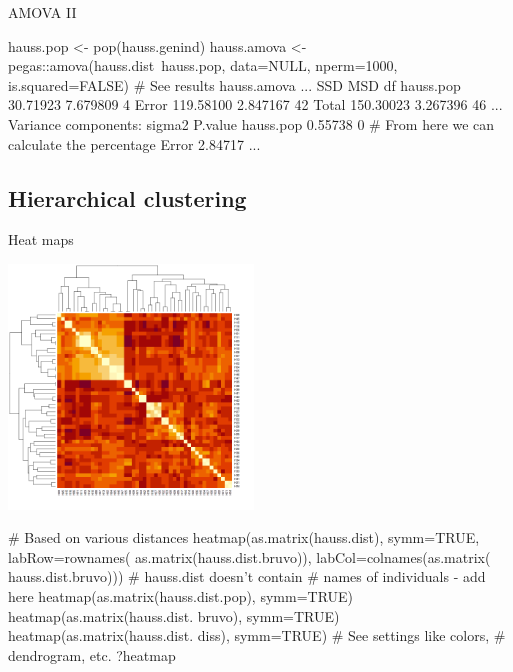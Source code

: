 \documentclass[compress, ucs, xelatex, 11pt, xcolor=svgnames, aspectratio=169,
	hyperref={
		bookmarks=true,
		unicode=true,
		colorlinks=true,
		pdftitle={Molecular data in R},
		plainpages=false,
		pdfauthor={Vojtech Zeisek},
		pdfsubject={Course about phylogeny and evolution in R},
		pdfcreator={XeLaTeX},
		pdfkeywords={R, evolution, phylogeny, molecular data},
		linkcolor=Crimson, %
		anchorcolor=Magenta, %
		citecolor=Magenta, %
		filecolor=Magenta, %
		menucolor=Magenta, %
		urlcolor=DodgerBlue, %
		pdftex},
	url={hyphens, lowtilde} %
	]{beamer}
\begin{document}
\begin{frame}[fragile]{AMOVA II}
	\begin{spluscode}
    hauss.pop <- pop(hauss.genind)
    hauss.amova <- pegas::amova(hauss.dist~hauss.pop, data=NULL,
      nperm=1000, is.squared=FALSE)
    # See results
    hauss.amova
    ...
                    SSD      MSD df
    hauss.pop  30.71923 7.679809  4
    Error     119.58100 2.847167 42
    Total     150.30023 3.267396 46
    ...
    Variance components:
               sigma2 P.value
    hauss.pop 0.55738       0 # From here we can calculate the percentage
    Error     2.84717
    ...
	\end{spluscode}
\end{frame}

\subsection{Hierarchical clustering}

\begin{frame}[fragile]{Heat maps}
	\label{hierclust}
	\begin{multicols}{2}
		\includegraphics[height=6.5cm]{heatmap.png}
		\columnbreak
		\begin{spluscode}
    # Based on various distances
    heatmap(as.matrix(hauss.dist),
      symm=TRUE, labRow=rownames(
      as.matrix(hauss.dist.bruvo)),
      labCol=colnames(as.matrix(
      hauss.dist.bruvo)))
      # hauss.dist doesn't contain
      # names of individuals - add here
    heatmap(as.matrix(hauss.dist.pop),
      symm=TRUE)
    heatmap(as.matrix(hauss.dist.
      bruvo), symm=TRUE)
    heatmap(as.matrix(hauss.dist.
      diss), symm=TRUE)
    # See settings like colors,
    # dendrogram, etc.
    ?heatmap
		\end{spluscode}
	\end{multicols}
\end{frame}
\end{document}
